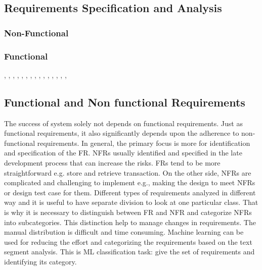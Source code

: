 \subsection{Requirements Specification and Analysis}

\subsubsection{Non-Functional}

\cite{Slankas:2013}

\subsubsection{Functional}

\cite{Deocadez:2017}, \cite{Kurtanovic:2017}, \cite{Guzman:2017},
\cite{Abad:2017}, \cite{Dekhtyar:2017}, \cite{Rashwan:2012}, \cite{Lu:2017},
\cite{Hayes:2014}, \cite{Williams:2017}, \cite{Garzoli:2013},
\cite{Casamayor:2010}, \cite{Wang:2016}, \cite{Hussain:2012}, \cite{Jiang:2014},
\cite{Jha:2017}, \cite{Pinquie:2015}

\subsection{Functional and Non functional Requirements}

The success of system solely not depends on functional requirements. Just as functional requirements, it also significantly depends upon the adherence to non-functional requirements. In general, the primary focus is more for identification and specification of the FR.  NFRs usually identified and specified in the late development process that can increase the risks. FRs tend to be more straightforward e.g. store and retrieve transaction. On the other side, NFRs are complicated and challenging to implement e.g., making the design to meet NFRs or design test case for them. Different types of requirements analyzed in different way and it is useful to have separate division to look at one particular class. That is why it is necessary to distinguish between FR and NFR and categorize NFRs into subcategories. This distinction help to manage changes in requirements. The manual distribution is difficult and time consuming. Machine learning can be used for reducing the effort and categorizing the requirements based on the text segment analysis. This is ML classification task: give the set of requirements and identifying its category. \\

